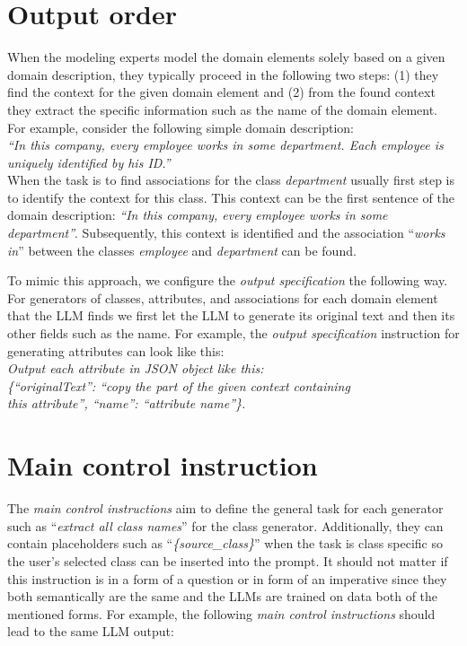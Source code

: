 \section{Output order}
\label{sec:output_order}

When the modeling experts model the domain elements solely based on a given domain description, they typically proceed in the following two steps: (1) they find the context for the given domain element and (2) from the found context they extract the specific information such as the name of the domain element. For example, consider the following simple domain description: \\

\noindent{}\textit{``In this company, every employee works in some department. Each employee is uniquely identified by his ID.''} \\

\noindent{}When the task is to find associations for the class \textit{department} usually first step is to identify the context for this class. This context can be the first sentence of the domain description: \textit{``In this company, every employee works in some department''}. Subsequently, this context is identified and the association ``\textit{works in}'' between the classes \textit{employee} and \textit{department} can be found.

To mimic this approach, we configure the \emph{output specification} the following way. For generators of classes, attributes, and associations for each domain element that the LLM finds we first let the LLM to generate its original text and then its other fields such as the name. For example, the \emph{output specification} instruction for generating attributes can look like this: \\

\noindent{}\textit{Output each attribute in JSON object like this: \\
\{``originalText'': ``copy the part of the given context containing \\ this attribute'', ``name'': ``attribute name''\}.}


\section{Main control instruction}

The \emph{main control instructions} aim to define the general task for each generator such as ``\textit{extract all class names}'' for the class generator. Additionally, they can contain placeholders such as ``\textit{\{source\_class\}}'' when the task is class specific so the user's selected class can be inserted into the prompt. It should not matter if this instruction is in a form of a question or in form of an imperative since they both semantically are the same and the LLMs are trained on data both of the mentioned forms. For example, the following \emph{main control instructions} should lead to the same LLM output:

